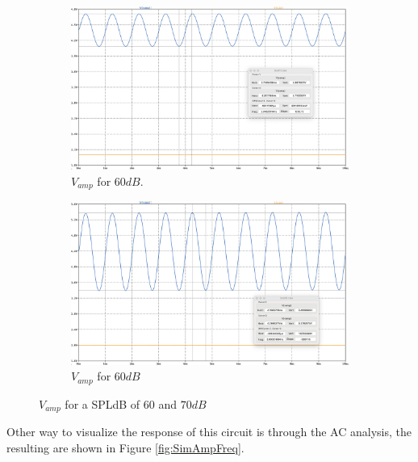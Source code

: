 \begin{figure}[H]
    \centering
    \begin{subfigure}{0.45\textwidth}
        \includegraphics*[width=\textwidth]{Images/SimAmp112.png}
        \caption{$V_{amp}$ for $60dB$.}
        \label{fig:SimAmp112}  
    \end{subfigure}
    \begin{subfigure}{0.45\textwidth}
        \includegraphics*[width=\textwidth]{Images/SimAmp355.png}
        \caption{$V_{amp}$ for $60dB$}
        \label{fig:SimAmp355}    
    \end{subfigure}
    \caption{$V_{amp}$ for a SPLdB of $60$ and $70dB$}
    \label{fig:SimPreAmp}
\end{figure}

Other way to visualize the response of this circuit is through the AC analysis, the resulting are shown in Figure \ref{fig:SimAmpFreq}.

